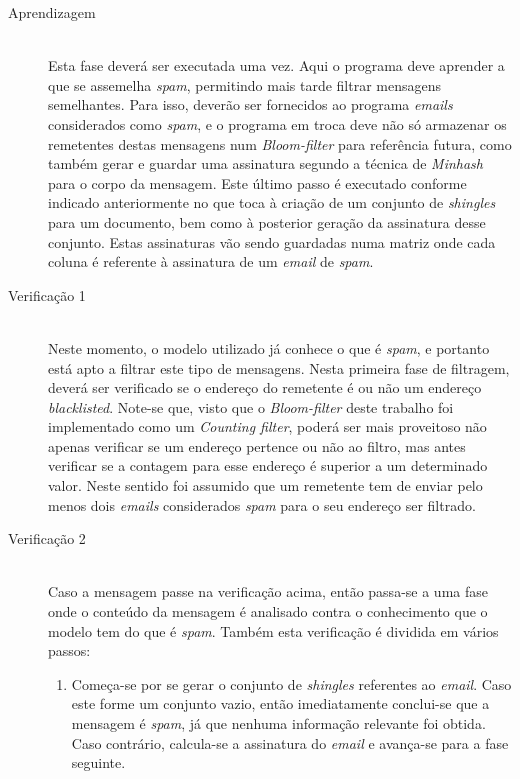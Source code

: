 \documentclass[a4paper,11pt,openright,oneside]{report}
\begin{document}
\begin{description}
\item[Aprendizagem] \hfill \\
  Esta fase deverá ser executada uma vez. Aqui o programa deve aprender a que se assemelha \textit{spam}, permitindo mais tarde filtrar mensagens semelhantes. Para isso, deverão ser fornecidos ao programa \textit{emails} considerados como \textit{spam}, e o programa em troca deve não só armazenar os remetentes destas mensagens num \textit{Bloom-filter} para referência futura, como também gerar e guardar uma assinatura segundo a técnica de \textit{Minhash} para o corpo da mensagem. Este último passo é executado conforme indicado anteriormente no que toca à criação de um conjunto de \textit{shingles} para um documento, bem como à posterior geração da assinatura desse conjunto. Estas assinaturas vão sendo guardadas numa matriz onde cada coluna é referente à assinatura de um \textit{email} de \textit{spam}.
\item[Verificação 1] \hfill \\
  Neste momento, o modelo utilizado já conhece o que é \textit{spam}, e portanto está apto a filtrar este tipo de mensagens. Nesta primeira fase de filtragem, deverá ser verificado se o endereço do remetente é ou não um endereço \textit{blacklisted}. Note-se que, visto que o \textit{Bloom-filter} deste trabalho foi implementado como um \textit{Counting filter}, poderá ser mais proveitoso não apenas verificar se um endereço pertence ou não ao filtro, mas antes verificar se a contagem para esse endereço é superior a um determinado valor. Neste sentido foi assumido que um remetente tem de enviar pelo menos dois \textit{emails} considerados \textit{spam} para o seu endereço ser filtrado.
\item[Verificação 2] \hfill \\
  Caso a mensagem passe na verificação acima, então passa-se a uma fase onde o conteúdo da mensagem é analisado contra o conhecimento que o modelo tem do que é \textit{spam}. Também esta verificação é dividida em vários passos:
  \begin{enumerate}
  \item Começa-se por se gerar o conjunto de \textit{shingles} referentes ao \textit{email}. Caso este forme um conjunto vazio, então imediatamente conclui-se que a mensagem é \textit{spam}, já que nenhuma informação relevante foi obtida. Caso contrário, calcula-se a assinatura do \textit{email} e avança-se para a fase seguinte. \\

\end{enumerate}
\end{description}
\end{document}
